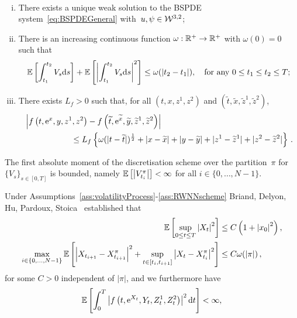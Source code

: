 \begin{assumption}\label{ass:RWNNscheme}\
\begin{enumerate}[(i)]
    \item There exists a unique weak solution to the BSPDE system~\eqref{eq:BSPDEGeneral} with~${u, \psi \in \mathcal{W}^{3,2}}$;
    \item There is an increasing continuous function $\omega:\mathbb{R}^+ \rightarrow\mathbb{R}^+$ with $\omega(0)=0$ such that
    \[
    \mathbb{E}\left[\int_{t_1}^{t_2}V_s\mathrm{d} s\right] + \mathbb{E}\left[\left|\int_{t_1}^{t_2}V_s\mathrm{d} s\right|^2\right]\leq \omega(|t_2-t_1|),
    \quad \text{for any }0\leq t_1 \leq t_2 \leq T;
    \]
    \item There exists $L_f>0$ such that,
    for all $(t,x,z^1,z^2)$ and $(\widetilde{t},\widetilde{x},\widetilde{z}^1,\widetilde{z}^2)$,
    \begin{align}
    & \left|f\left(t, \mathrm{e}^x, y, z^1, z^2\right)
    -f\left(\widetilde{t}, \mathrm{e}^{\widetilde{x}},\widetilde{y},\widetilde{z}^1,\widetilde{z}^2\right)\right| \\
    & \hspace*{2cm} \leq L_f\left\{\omega(|t-\widetilde{t}|)^{\frac{1}{2}} + |x-\widetilde{x}| + |y-\widetilde y| + |z^1-\widetilde{z}^1| + |z^2-\widetilde{z}^2|\right\}\,.
    \end{align}
\end{enumerate}
\end{assumption}
\begin{assumption}\label{ass:discretisationbound}
The first absolute moment of the discretisation scheme over the partition~$\pi$ for $\{V_s\}_{s\in[0, T]}$ is bounded, namely $ \mathbb{E}\left[\left|V^\pi_{t_i}\right| \right] < \infty$ for all $i\in\{0,\dots, N-1\}.$
\end{assumption}
Under Assumptions~\ref{ass:volatilityProcess}-\ref{ass:RWNNscheme} Briand, Delyon, Hu, Pardoux, Stoica~\cite{Briand2003LpEquations} established that
\begin{align}
    \mathbb{E}\left[\sup _{0 \leq t \leq T}\left|X_{t}\right|^{2}\right] &\leq C\left(1+\left|x_{0}\right|^{2}\right),\label{eq:solution_moment_bound} \\
    \max_{i\in\{0,\dots,N-1\}} \mathbb{E}\left[\left|X_{t_{i+1}}-X^\pi_{t_{i+1}}\right|^{2}+\sup _{t \in\left[t_{i}, t_{i+1}\right]}\left|X_{t}-X^\pi_{t_{i}}\right|^{2}\right] &\leq C \omega(|\pi|)\,,\label{eq:fwd_process_estimation}
\end{align}
for some $C>0$ independent of $|\pi|$,
and we furthermore have~\cite{Briand2003LpEquations}
\begin{equation}\label{eq:L2int_f}
\mathbb{E}\left[\int_{0}^{T}\left|f\left(t, \mathrm{e}^{X_{t}}, Y_{t}, Z^1_{t}, Z^2_{t}\right)\right|^{2} \mathrm{d} t\right]<\infty,
\end{equation}
